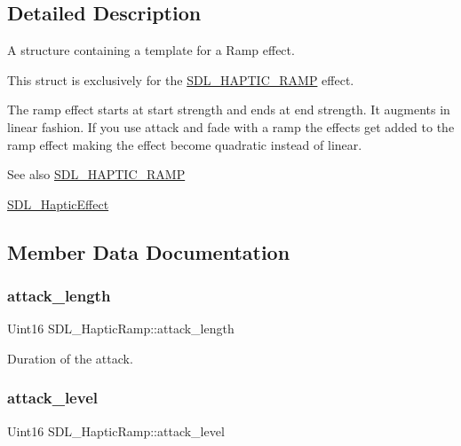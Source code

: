 \subsection{Detailed Description}
A structure containing a template for a Ramp effect. 

This struct is exclusively for the \mbox{\hyperlink{_s_d_l__haptic_8h_af10eb937a64a8f602e9c46682ac0d868}{S\+D\+L\+\_\+\+H\+A\+P\+T\+I\+C\+\_\+\+R\+A\+MP}} effect.

The ramp effect starts at start strength and ends at end strength. It augments in linear fashion. If you use attack and fade with a ramp the effects get added to the ramp effect making the effect become quadratic instead of linear.

\begin{DoxySeeAlso}{See also}
\mbox{\hyperlink{_s_d_l__haptic_8h_af10eb937a64a8f602e9c46682ac0d868}{S\+D\+L\+\_\+\+H\+A\+P\+T\+I\+C\+\_\+\+R\+A\+MP}} 

\mbox{\hyperlink{union_s_d_l___haptic_effect}{S\+D\+L\+\_\+\+Haptic\+Effect}} 
\end{DoxySeeAlso}


\subsection{Member Data Documentation}
\mbox{\label{struct_s_d_l___haptic_ramp_adbcd7ffb05016d442c73e81cc0fcbbd2}} 
\subsubsection{\texorpdfstring{attack\_length}{attack\_length}}
{\footnotesize\ttfamily Uint16 S\+D\+L\+\_\+\+Haptic\+Ramp\+::attack\+\_\+length}

Duration of the attack. \mbox{\label{struct_s_d_l___haptic_ramp_a755933bbda14ae9b53c574b9fe6291a0}} 
\subsubsection{\texorpdfstring{attack\_level}{attack\_level}}
{\footnotesize\ttfamily Uint16 S\+D\+L\+\_\+\+Haptic\+Ramp\+::attack\+\_\+level}

